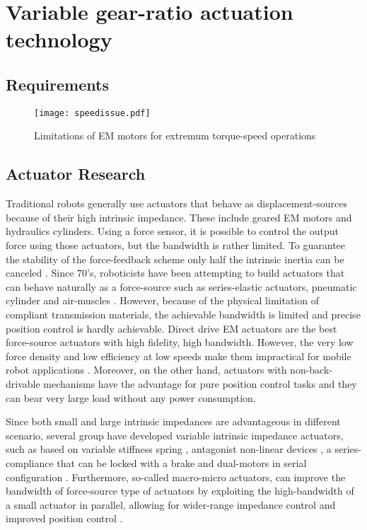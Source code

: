 \chapter{Variable gear-ratio actuation technology}
\label{sec:MultipleSpeedActuationTechnology}

\section{Requirements}
\label{sec:Requirements}

\begin{figure}[H]
	\centering
		\texttt{[image: speedissue.pdf]}
	\caption{Limitations of EM motors for extremum torque-speed operations}
	\label{fig:speedissue}
\end{figure}

\section{Actuator Research}
\label{sec:actres}

Traditional robots generally use actuators that behave as displacement-sources because of their high intrinsic impedance. These include geared EM motors and hydraulics cylinders. Using a force sensor, it is possible to control the output force using those actuators, but the bandwidth is rather limited. To guarantee the stability of the force-feedback scheme only half the intrinsic inertia can be canceled \cite{hogan_impedance_2004}. Since 70's, roboticists have been attempting to build actuators that can behave naturally as a force-source such as series-elastic actuators, pneumatic cylinder and air-muscles \cite{hanafusa_stable_1977}\cite{pratt_series_1995}. However, because of the physical limitation of compliant transmission materials, the achievable bandwidth is limited and precise position control is hardly achievable. Direct drive EM actuators are the best force-source actuators with high fidelity, high bandwidth. However, the very low force density and low efficiency at low speeds make them impractical for mobile robot applications \cite{hollerbach_comparative_1992}. Moreover, on the other hand, actuators with non-back-drivable mechanisms have the advantage for pure position control tasks and they can bear very large load without any power consumption.

Since both small and large intrinsic impedances are advantageous in different scenario, several group have developed variable intrinsic impedance actuators, such as based on variable stiffness spring \cite{tonietti_design_2005}, antagonist non-linear devices \cite{koganezawa_antagonistic_2006}, a series-compliance that can be locked with a brake \cite{leach_linear_2012} and dual-motors in serial configuration \cite{kim_serial-type_2010}. Furthermore, so-called macro-micro actuators, can improve the bandwidth of force-source type of actuators by exploiting the high-bandwidth of a small actuator in parallel, allowing for wider-range impedance control and improved position control \cite{morrell_parallel-coupled_1998}.

